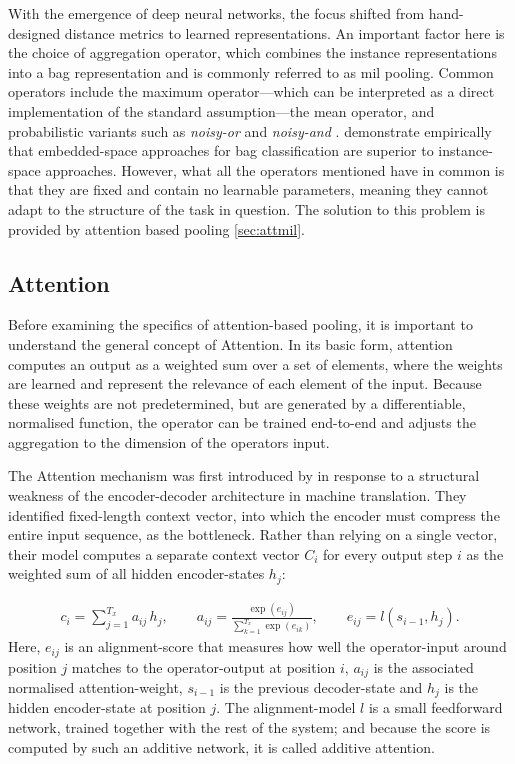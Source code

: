 \documentclass[12pt,parskip = half, DIV=classic,listof=totoc]{scrartcl}
\begin{document}
			With the emergence of deep neural networks, the focus shifted from hand-designed distance metrics to learned representations. An important factor here is 
			the choice of aggregation operator, which combines the instance representations into a bag representation and is commonly referred to as \ac{mil} pooling. 
			Common operators include the maximum operator—which can be interpreted as a direct implementation of the standard assumption—the mean operator, 
			and probabilistic variants such as \textit{noisy-or} \cite{maronFrameworkMultipleInstanceLearning1997} and \textit{noisy-and} \cite{krausClassifyingSegmentingMicroscopy2016}. \textcite{wangRevisitingMultipleInstance2018} demonstrate empirically 
			that embedded-space approaches for bag classification are superior to instance-space approaches. However, what all the operators mentioned have in common is 
			that they are fixed and contain no learnable parameters, meaning they cannot adapt to the structure of the task in question. The solution to this problem 
			is provided by attention based pooling \ref{sec:attmil}.

			
		\subsection{Attention}
			Before examining the specifics of attention-based pooling, it is important to understand the general concept of Attention.
			In its basic form, attention computes an output as a weighted sum over a set of elements, where the weights
			are learned and represent the relevance of each element of the input. Because these weights are not predetermined, 
			but are generated by a differentiable, normalised function, the operator can be trained end-to-end and 
			adjusts the aggregation to the dimension of the operators input.
			
			The Attention mechanism was first introduced by \textcite{bahdanauNeuralMachineTranslation2016} in response to a structural 
			weakness of the encoder-decoder architecture in machine translation. They identified fixed-length context vector, into which the encoder must compress
			the entire input sequence, as the bottleneck. Rather than relying on a single vector, their model computes a separate context vector 
			$C_i$ for every output step $i$ as the weighted sum of all hidden encoder-states $h_j$:
			
			\begin{align*}
				c_i = \sum_{j=1}^{T_x} a_{ij}\, h_j, \qquad
				a_{ij} = \frac{\exp(e_{ij})}{\sum_{k=1}^{T_x} \exp(e_{ik})}, \qquad
				e_{ij} = l(s_{i-1}, h_j).
			\end{align*}
			Here, $e_{ij}$ is an alignment-score that measures how well the operator-input around position $j$ matches to the 
			operator-output at position $i$, $a_{ij}$ is the associated normalised attention-weight, $s_{i-1}$ is the previous decoder-state
			and $h_j$ is the hidden encoder-state at position $j$. The alignment-model $l$ is a small feedforward network, trained together 
			with the rest of the system; and because the score is computed by such an additive network, it is called additive attention.
\end{document}
